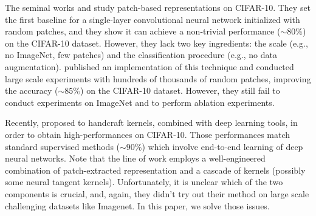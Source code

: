 \documentclass{article}
\begin{document}
The seminal works \cite{coates2011analysis} and \cite{coates2011importance}  study patch-based representations on CIFAR-10.
They set the first baseline for a single-layer convolutional neural network initialized with random patches, and they show it  can achieve a non-trivial performance ($\sim 80 \%$) on the CIFAR-10 dataset. However, they lack two key ingredients: the scale (e.g., no ImageNet, few patches) and the classification procedure (e.g., no data augmentation).
 \citep{recht2019imagenet} published an implementation of this technique and conducted large scale experiments with hundreds of thousands of random patches, improving the accuracy ($\sim 85 \%$) on the CIFAR-10 dataset.
However, they still fail to conduct experiments on ImageNet and to perform  ablation experiments.


Recently, \citep{li2019enhanced,shankar2020neural} proposed to handcraft kernels, combined with deep learning tools, in order to obtain high-performances on CIFAR-10.
Those performances  match standard supervised methods ($\sim 90\%$) which involve end-to-end learning of deep neural networks.
Note that the line of work \citep{li2019enhanced,shankar2020neural,mairal2016end} employs a well-engineered combination of patch-extracted representation and a cascade of kernels (possibly some neural tangent kernels).
Unfortunately, it is unclear which of the two components is crucial, and, again, they didn't try out their method on large scale challenging datasets like Imagenet.
In this paper, we solve those issues.
\end{document}
